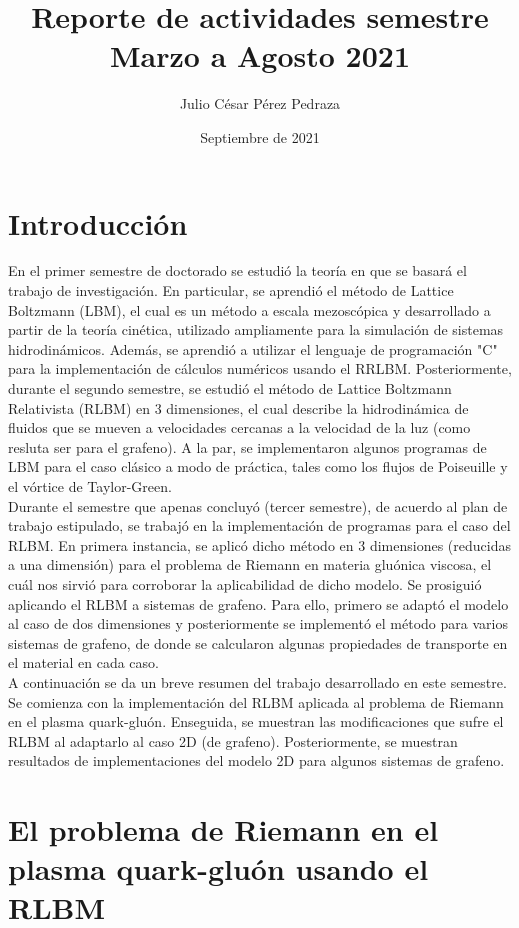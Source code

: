 \documentclass{article}
\title{Reporte de actividades semestre Marzo a Agosto 2021}
\author{Julio César Pérez Pedraza}
\date{Septiembre de 2021}
\begin{document}
\maketitle

\section{Introducción}
En el primer semestre de doctorado se estudió la teoría en que se basará el trabajo de investigación. En particular, se aprendió el método de Lattice Boltzmann (LBM), el cual es un método a escala mezoscópica y desarrollado a partir de la teoría cinética, utilizado ampliamente para la simulación de sistemas hidrodinámicos. Además, se aprendió a utilizar el lenguaje de programación "C" para la implementación de cálculos numéricos usando el RRLBM. Posteriormente, durante el segundo semestre, se estudió el método de Lattice Boltzmann Relativista (RLBM) en 3 dimensiones, el cual describe la hidrodinámica de fluidos que se mueven a velocidades cercanas a la velocidad de la luz (como resluta ser para el grafeno). A la par, se implementaron algunos programas de LBM para el caso clásico a modo de práctica, tales como los flujos de Poiseuille y el vórtice de Taylor-Green.\\

Durante el semestre que apenas concluyó (tercer semestre), de acuerdo al plan de trabajo estipulado, se trabajó en la implementación de programas para el caso del RLBM. En primera instancia, se aplicó dicho método en 3 dimensiones (reducidas a una dimensión) para el problema de Riemann en materia gluónica viscosa, el cuál nos sirvió para corroborar la aplicabilidad de dicho modelo. Se prosiguió aplicando el RLBM a sistemas de grafeno. Para ello, primero se adaptó el modelo al caso de dos dimensiones y posteriormente se implementó el método para varios sistemas de grafeno, de donde se calcularon algunas propiedades de transporte en el material en cada caso.\\

A continuación se da un breve resumen del trabajo desarrollado en este semestre. Se comienza con la implementación del RLBM aplicada al problema de Riemann en el plasma quark-gluón. Enseguida, se muestran las modificaciones que sufre el RLBM al adaptarlo al caso 2D (de grafeno). Posteriormente, se muestran resultados de implementaciones del modelo 2D para algunos sistemas de grafeno. 

\section{El problema de Riemann en el plasma quark-gluón usando el RLBM}
\end{document}
